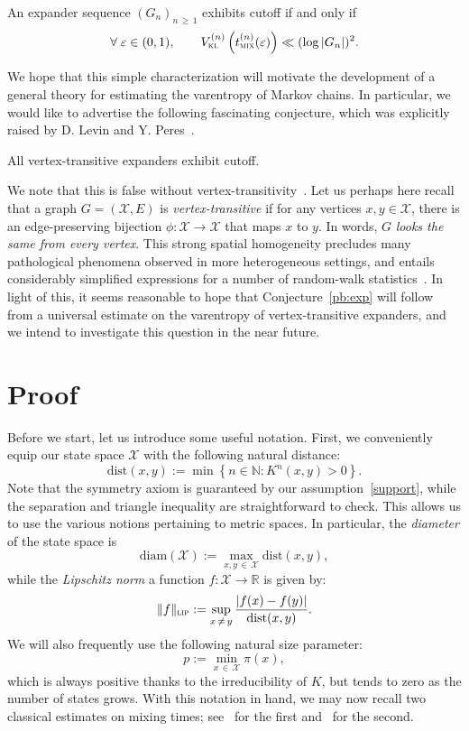 \documentclass[10pt]{amsart}
\theoremstyle{definition}\newtheorem{defi}[theo]{Definition}\newtheorem{rema}[theo]{Remark}\newtheorem{exam}[theo]{Example}\newtheorem{exem}[theo]{Example}\newtheorem{nota}[theo]{Notation}
\newcommand{\N}{\mathbb{N}}
\newcommand{\R}{\mathbb{R}}
\newcommand{\cX}{\mathcal{X}}
\newcommand{\dist}{\mathrm{dist}}
\newcommand{\vkl}{V_{\textsc{kl}}}
\newcommand{\tmix}{t_{\textsc{mix}}}
\newcommand{\diam}{\mathrm{diam}}
\newcommand{\lip}{{\textsc{lip}}}
\let\oldforall\forall
\renewcommand*{\forall}{\mathrel{\oldforall}}
\begin{document}
\begin{coro}[Expanders]
An expander sequence $(G_n)_{n\,\ge\,1}$ exhibits cutoff if and only if
\[
\forall\varepsilon\in(0,1),\qquad \vkl^{(n)}\left(\tmix^{(n)}(\varepsilon)\right) \ll (\log |G_n|)^2.
\]
\end{coro}

We hope that this simple characterization will motivate the development of a general theory for estimating the varentropy of Markov chains. In particular, we would like to advertise the following fascinating conjecture, which was explicitly raised by D. Levin and Y. Peres~\cite[Question~5]{MR3726904}.


\begin{conj}\label{pb:exp}
All vertex-transitive expanders exhibit cutoff.
\end{conj}

We note that this is false without vertex-transitivity~\cite{MR2774096}. Let us perhaps here recall that a graph $G=(\cX,E)$ is \emph{vertex-transitive} if for any vertices $x,y\in \cX$, there is an edge-preserving bijection $\phi\colon \cX\to \cX$ that maps $x$ to $y$. In words, $G$ \emph{looks the same from every vertex}. This strong spatial homogeneity precludes many pathological phenomena observed in more heterogeneous settings, and entails considerably simplified expressions for a number of random-walk statistics~\cite{MR994089,arxiv.2001.01467,MR4253426}. In light of this, it seems reasonable to hope that Conjecture~\ref{pb:exp} will follow from a universal estimate on the varentropy of vertex-transitive expanders, and we intend to investigate this question in the near future.



\section{Proof}

Before we start, let us introduce some useful notation. First, we conveniently equip our state space $\cX$ with the following natural distance:
\[
\dist(x,y) := \min\left\{n\in\N\colon K^n(x,y)>0\right\}.
\]
Note that the symmetry axiom is guaranteed by our assumption~\eqref{support}, while the separation and triangle inequality are straightforward to check. This allows us to use the various notions pertaining to metric spaces. In particular, the \emph{diameter} of the state space is
\[
\diam(\cX) := \max_{x,y\,\in\,\cX}\dist(x,y),
\]
while the \emph{Lipschitz norm} a function $f\colon\cX\to\R$ is given by:
\[
\|f\|_\lip := \sup_{x\,\ne\,y}\frac{|f(x)-f(y)|}{\dist(x,y)}.
\]
We will also frequently use the following natural size parameter:
\[
p := \min_{x\,\in\,\cX}\pi(x),
\]
which is always positive thanks to the irreducibility of $K$, but tends to zero as the number of states grows. With this notation in hand, we may now recall two classical estimates on mixing times; see~\cite[Lemma~11]{arxiv.2102.05597} for the first and~\cite[Corollary~2.6]{MR2341319} for the second.
\end{document}
